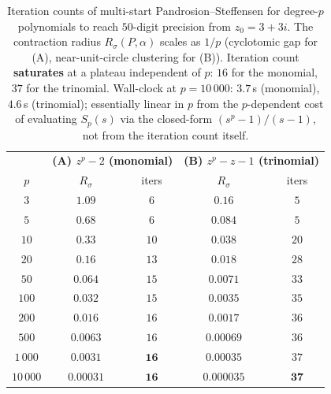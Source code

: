 \documentclass[11pt,a4paper]{article}
\theoremstyle{definition}
\begin{document}
\begin{table}[H]
\centering
\small
\renewcommand{\arraystretch}{1.15}
\begin{tabular}{c|cc|cc}
\toprule
& \multicolumn{2}{c|}{\textbf{(A) $z^p - 2$ (monomial)}} & \multicolumn{2}{c}{\textbf{(B) $z^p - z - 1$ (trinomial)}} \\
$p$ & $R_\sigma$ & iters & $R_\sigma$ & iters \\
\midrule
$3$        & $1.09$       & $6$  & $0.16$        & $5$  \\
$5$        & $0.68$       & $6$  & $0.084$       & $5$  \\
$10$       & $0.33$       & $10$ & $0.038$       & $20$ \\
$20$       & $0.16$       & $13$ & $0.018$       & $28$ \\
$50$       & $0.064$      & $15$ & $0.0071$      & $33$ \\
$100$      & $0.032$      & $15$ & $0.0035$      & $35$ \\
$200$      & $0.016$      & $16$ & $0.0017$      & $36$ \\
$500$      & $0.0063$     & $16$ & $0.00069$     & $36$ \\
$1\,000$    & $0.0031$     & $\mathbf{16}$ & $0.00035$     & $37$ \\
$10\,000$   & $0.00031$    & $\mathbf{16}$ & $0.000035$    & $\mathbf{37}$ \\
\bottomrule
\end{tabular}
\caption{Iteration counts of multi-start Pandrosion--Steffensen for degree-$p$ polynomials to reach $50$-digit precision from $z_0 = 3 + 3i$. The contraction radius $R_\sigma(P, \alpha)$ scales as $1/p$ (cyclotomic gap for (A), near-unit-circle clustering for (B)). Iteration count \textbf{saturates} at a plateau independent of $p$: $16$ for the monomial, $37$ for the trinomial. Wall-clock at $p = 10\,000$: $3.7$\,s (monomial), $4.6$\,s (trinomial); essentially linear in $p$ from the $p$-dependent cost of evaluating $S_p(s)$ via the closed-form $(s^p - 1)/(s - 1)$, not from the iteration count itself.}
\label{tab:large-p}
\end{table}
\end{document}
